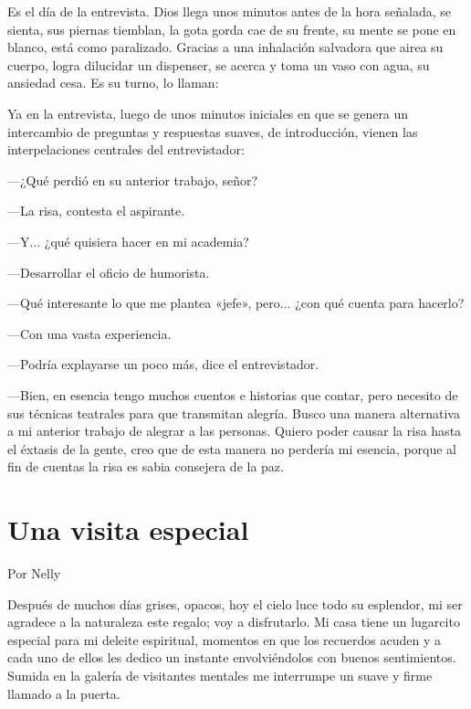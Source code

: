 \documentclass[11pt,twoside,openright,a5paper]{book}
\begin{document}
Es el día de la entrevista. Dios llega unos minutos antes de la hora señalada, se sienta, sus piernas tiemblan, la gota gorda cae de su frente, su mente se pone en blanco, está como paralizado. Gracias a una inhalación salvadora que airea su cuerpo, logra dilucidar un dispenser, se acerca y toma un vaso con agua, su ansiedad cesa. Es su turno, lo llaman:

Ya en la entrevista, luego de unos minutos iniciales en que se genera un intercambio de preguntas y respuestas suaves, de introducción, vienen las interpelaciones centrales del entrevistador:

---¿Qué perdió en su anterior trabajo, señor? 

---La risa, contesta el aspirante.

---Y... ¿qué quisiera hacer en mi academia?

---Desarrollar el oficio de humorista.

---Qué interesante lo que me plantea «jefe», pero... ¿con qué cuenta para hacerlo? 

---Con una vasta experiencia.

---Podría explayarse un poco más, dice el entrevistador.

---Bien, en esencia tengo muchos cuentos e historias que contar, pero necesito de sus técnicas teatrales para que transmitan alegría. Busco una manera alternativa a mi anterior trabajo de alegrar a las personas. Quiero poder causar la risa hasta el éxtasis de la gente, creo que de esta manera no perdería mi esencia, porque al fin de cuentas la risa es sabia consejera de la paz.

\section*{Una visita especial}

                                                                                              \begin{flushright}Por Nelly\end{flushright}
 
Después de muchos días grises, opacos, hoy el cielo luce todo su esplendor, mi ser agradece a la naturaleza este regalo; voy a disfrutarlo. Mi casa tiene un lugarcito especial para mi deleite espiritual, momentos en que los recuerdos acuden y a cada uno de ellos les dedico un instante envolviéndolos con buenos sentimientos. Sumida en la galería de visitantes mentales me interrumpe un suave y firme llamado a la puerta.
\end{document}
